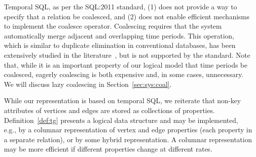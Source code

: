 Temporal SQL, as per the SQL:2011 standard, (1) does not provide a way
to specify that a relation be coalesced, and (2) does not enable
efficient mechanisms to implement the coalesce operator.  Coalescing
requires that the system automatically merge adjacent and overlapping
time periods.  This operation, which is similar to duplicate
elimination in conventional databases, has been extensively studied in
the
literature~\cite{DBLP:conf/vldb/BohlenSS96,DBLP:journals/sigmod/Zimanyi06},
but is not supported by the standard.  Note that, while it is an
important property of our logical model that time periods be
coalesced, eagerly coalescing is both expensive and, in some cases,
unnecessary.  We will discuss lazy coalescing in
Section~\ref{sec:sys:coal}.

While our \ve representation is based on temporal SQL, we reiterate
that non-key attributes of vertices and edges are stored as
collections of properties.  Definition~\ref{def:tg} presents a logical
data structure and may be implemented, e.g., by a columnar
representation of vertex and edge properties (each property in a
separate relation), or by some hybrid representation.  A columnar
representation may be more efficient if different properties change at
different rates.


